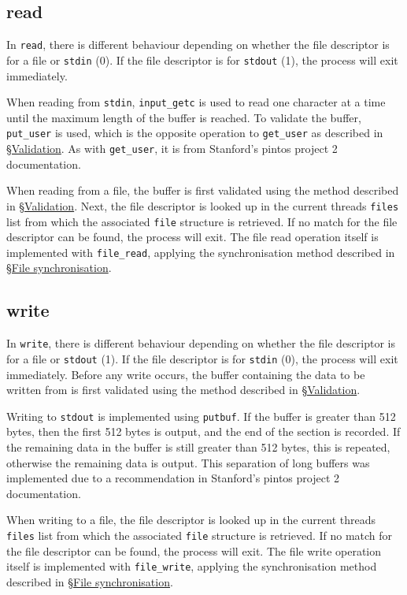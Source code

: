 \documentclass{article}
\begin{document}
\subsection{read}
\label{sec:read}

In \verb!read!, there is different behaviour depending on whether the file descriptor is for a file or \verb!stdin! (0). If the file descriptor is for \verb!stdout! (1), the process will exit immediately.

When reading from \verb!stdin!, \verb!input_getc! is used to read one character at a time until the maximum length of the buffer is reached. To validate the buffer, \verb!put_user! is used, which is the opposite operation to \verb!get_user! as described in \hyperref[sec:validation]{\S Validation}. As with \verb!get_user!, it is from Stanford's pintos project 2 documentation.

When reading from a file, the buffer is first validated using the method described in \hyperref[sec:validation]{\S Validation}. Next, the file descriptor is looked up in the current threads \verb!files! list from which the associated \verb!file! structure is retrieved. If no match for the file descriptor can be found, the process will exit. The file read operation itself is implemented with \verb!file_read!, applying the synchronisation method described in \hyperref[sec:file-synchronisation]{\S File synchronisation}.

\subsection{write}
\label{sec:write}

In \verb!write!, there is different behaviour depending on whether the file descriptor is for a file or \verb!stdout! (1). If the file descriptor is for \verb!stdin! (0), the process will exit immediately. Before any write occurs, the buffer containing the data to be written from is first validated using the method described in \hyperref[sec:validation]{\S Validation}.

Writing to \verb!stdout! is implemented using \verb!putbuf!. If the buffer is greater than 512 bytes, then the first 512 bytes is output, and the end of the section is recorded. If the remaining data in the buffer is still greater than 512 bytes, this is repeated, otherwise the remaining data is output. This separation of long buffers was implemented due to a recommendation in Stanford's pintos project 2 documentation.

When writing to a file, the file descriptor is looked up in the current threads \verb!files! list from which the associated \verb!file! structure is retrieved. If no match for the file descriptor can be found, the process will exit. The file write operation itself is implemented with \verb!file_write!, applying the synchronisation method described in \hyperref[sec:file-synchronisation]{\S File synchronisation}.
\end{document}

